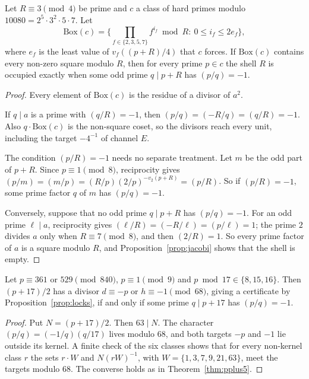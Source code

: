 \begin{theorem}\label{thm:visiblebox}
Let $R\equiv3\pmod4$ be prime and $c$ a class of hard primes modulo $10080=2^5\cdot3^2\cdot5\cdot7$. Let
\[
\mathrm{Box}(c)=\Big\{\prod_{f\in\{2,3,5,7\}}f^{i_f}\bmod R:\ 0\le i_f\le2e_f\Big\},
\]
where $e_f$ is the least value of $v_f((p+R)/4)$ that $c$ forces. If $\mathrm{Box}(c)$ contains every non-zero square modulo $R$, then for every prime $p\in c$ the shell $R$ is occupied exactly when some odd prime $q\mid p+R$ has $(p/q)=-1$.
\end{theorem}
\begin{proof}
Every element of $\mathrm{Box}(c)$ is the residue of a divisor of $a^2$.

If $q\mid a$ is a prime with $(q/R)=-1$, then $(p/q)=(-R/q)=(q/R)=-1$. Also $q\cdot\mathrm{Box}(c)$ is the non-square coset, so the divisors reach every unit, including the target $-4^{-1}$ of channel $E$.

The condition $(p/R)=-1$ needs no separate treatment. Let $m$ be the odd part of $p+R$. Since $p\equiv1\pmod8$, reciprocity gives $(p/m)=(m/p)=(R/p)(2/p)^{-v_2(p+R)}=(p/R)$. So if $(p/R)=-1$, some prime factor $q$ of $m$ has $(p/q)=-1$.

Conversely, suppose that no odd prime $q\mid p+R$ has $(p/q)=-1$. For an odd prime $\ell\mid a$, reciprocity gives $(\ell/R)=(-R/\ell)=(p/\ell)=1$; the prime $2$ divides $a$ only when $R\equiv7\pmod8$, and then $(2/R)=1$. So every prime factor of $a$ is a square modulo $R$, and Proposition~\ref{prop:jacobi} shows that the shell is empty.
\end{proof}

\begin{proposition}[$\mu=17$]\label{prop:mu17}
Let $p\equiv361$ or $529\pmod{840}$, $p\equiv1\pmod9$ and $p\bmod17\in\{8,15,16\}$. Then $(p+17)/2$ has a divisor $d\equiv-p$ or $h\equiv-1\pmod{68}$, giving a certificate by Proposition~\ref{prop:locks}, if and only if some prime $q\mid p+17$ has $(p/q)=-1$.
\end{proposition}
\begin{proof}
Put $N=(p+17)/2$. Then $63\mid N$. The character $(p/q)=(-1/q)(q/17)$ lives modulo $68$, and both targets $-p$ and $-1$ lie outside its kernel. A finite check of the six classes shows that for every non-kernel class $r$ the sets $r\cdot W$ and $N(rW)^{-1}$, with $W=\{1,3,7,9,21,63\}$, meet the targets modulo $68$. The converse holds as in Theorem~\ref{thm:pplus5}.
\end{proof}

